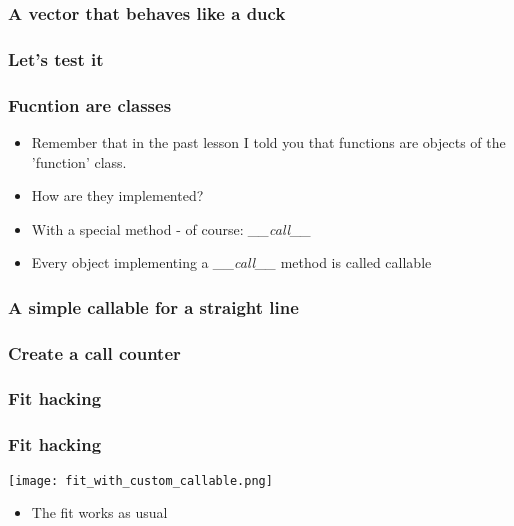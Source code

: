 \documentclass[9pt]{beamer}
\begin{document}
\begin{frame}
  \frametitle{A vector that behaves like a duck}
  
\end{frame}


\begin{frame}
  \frametitle{Let's test it}
  
\end{frame}


\begin{frame}
  \frametitle{Fucntion are classes}

  \begin{itemize}
    \item Remember that in the past lesson I told you that functions are objects
          of the 'function' class.
    \medskip
    \item How are they implemented?
    \medskip
    \item With a special method - of course: \emph{\_\_call\_\_}
    \medskip
    \item Every object implementing a \emph{\_\_call\_\_} method is called \alert{callable}
  \end{itemize}

\end{frame}


\begin{frame}
  \frametitle{A simple callable for a straight line}
  
\end{frame}


\begin{frame}
  \frametitle{Create a call counter}
  
\end{frame}


\begin{frame}
  \frametitle{Fit hacking}
  
\end{frame}


\begin{frame}
  \frametitle{Fit hacking}
  \centering
  \texttt{[image: fit\_with\_custom\_callable.png]}

  \medskip

  \begin{itemize}
    \item The fit works as usual
   \end{itemize}
\end{frame}
\end{document}
